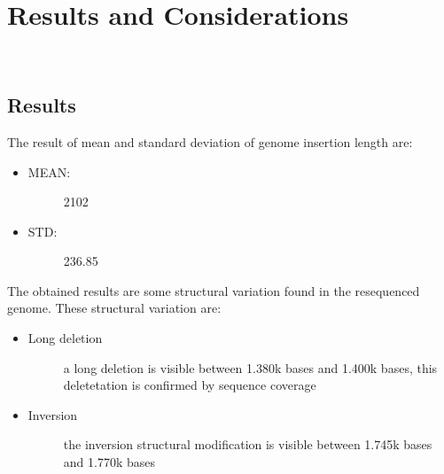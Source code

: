 
\chapter{Results and Considerations}
\label{cap:considerations}

\\
\section{Results}

The result of mean and standard deviation of genome insertion length are:
\begin{itemize}
\item \begin{description}
		\item[MEAN:] 2102
  \end{description}
\end{itemize}

\begin{itemize}
\item \begin{description}
		\item[STD:] 236.85
  \end{description}
\end{itemize}

The obtained results are some structural variation found in the resequenced genome.
These structural variation are:
\begin{itemize}
\item \begin{description}
		\item[Long deletion] a long deletion is visible between 1.380k bases and 1.400k bases, this deletetation is confirmed by sequence coverage
  \end{description}
\end{itemize}
\begin{itemize}
\item \begin{description}
		\item[Inversion] the inversion structural modification is visible between 1.745k bases and 1.770k bases
  \end{description}
\end{itemize}

